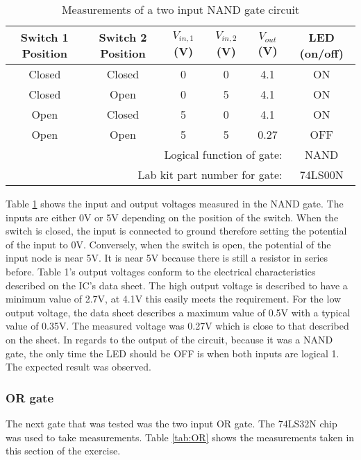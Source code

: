 \documentclass[CMPE]{KGCOEReport}
\begin{document}
\begin{table}[h]
\renewcommand{\arraystretch}{1.2}
\caption{Measurements of a two input NAND gate circuit}
\begin{center}
\begin{tabular}{|c|c|c|c|c|c|}
\hline
Switch 1 Position & Switch 2 Position & $V_{in,1}$ (V) & $V_{in,2}$ (V) & $V_{out}$ (V) & LED (on/off)\\\hline

Closed & Closed & 0 & 0 & 4.1  & ON \\\hline
Closed & Open   & 0 & 5 & 4.1  & ON \\\hline
Open   & Closed & 5 & 0 & 4.1  & ON \\\hline
Open   & Open   & 5 & 5 & 0.27 & OFF \\\hline
\multicolumn{5}{|r|}{Logical function of gate: } & NAND  \\\hline
\multicolumn{5}{|r|}{Lab kit part number for gate: } & 74LS00N  \\\hline

\end{tabular}
\end{center}
\label{tab:NAND}
\end{table}

Table \ref{tab:NAND} shows the input and output voltages measured in the NAND gate. The inputs are either 0V or 5V depending on the position of the switch. When the switch is closed, the input is connected to ground therefore setting the potential of the input to 0V. Conversely, when the switch is open, the potential of the input node is near 5V. It is near 5V because there is still a resistor in series before. Table 1's output voltages conform to the electrical characteristics described on the IC's data sheet. The high output voltage is described to have a minimum value of 2.7V, at 4.1V this easily meets the requirement. For the low output voltage, the data sheet describes a maximum value of 0.5V with a typical value of 0.35V. The measured voltage was 0.27V which is close to that described on the sheet. In regards to the output of the circuit, because it was a NAND gate, the only time the LED should be OFF is when both inputs are logical 1. The expected result was observed.

\subsubsection{OR gate}
The next gate that was tested was the two input OR gate. The 74LS32N chip was used to take measurements. Table \ref{tab:OR} shows the measurements taken in this section of the exercise.
\end{document}
